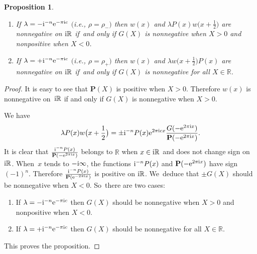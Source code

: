 \documentclass[pdftex]{sigma}
\newcommand{\RN}{\mathbb{R}} %
\newcommand{\bP}{\mathbf{P}}
\newtheorem{Proposition}[Theorem]{Proposition}
\theoremstyle{definition}
\numberwithin{equation}{section}
\begin{document}
\begin{Proposition}
\label{PropFromFunctionsToPolynomials}\qquad
\begin{enumerate}\itemsep=0pt
\item[$1.$]
If $\lambda=-{\rm i}^{-n}{\rm e}^{-\pi {\rm i}c}$ $($i.e., $\rho=\rho_-)$ then $w(x)$ and $\lambda P(x)w\big(x+\frac{1}{2}\big)$ are nonnegative on ${\rm i}\RN$ if~and only if $G(X)$ is nonnegative when $X>0$ and nonpositive when $X<0$.
\item[$2.$]
If $\lambda=+{\rm i}^{-n}{\rm e}^{-\pi {\rm i}c}$ $($i.e., $\rho=\rho_+)$ then $w(x)$ and $\lambda w\big(x+\frac{1}{2}\big)P(x)$ are nonnegative on ${\rm i}\RN$ if~and only if $G(X)$ is nonnegative for all $X\in \RN$.
\end{enumerate}

\end{Proposition}
\begin{proof}
It is easy to see that $\bP(X)$ is positive when $X>0$. Therefore $w(x)$ is nonnegative on~${\rm i}\RN$ if and only if $G(X)$ is nonnegative when $X>0$.

We have
\[
\lambda P(x)w\big(x+\frac{1}{2}\big)=\pm {\rm i}^{-n}P(x) {\rm e}^{2\pi {\rm i} cx}\frac{G(-{\rm e}^{2\pi {\rm i} x})}{\bP(-{\rm e}^{2\pi {\rm i} x})}.
\]
It is clear that $\frac{{\rm i}^{-n}P(x)}{\bP(-{\rm e}^{2\pi {\rm i} x})}$ belongs to $\RN$ when $x\in {\rm i}\RN$ and does not change sign on ${\rm i}\RN$. When~$x$ tends to $-{\rm i}\infty$, the functions ${\rm i}^{-n}P(x)$ and $\bP(-{\rm e}^{2\pi {\rm i} x})$ have sign $(-1)^n$. Therefore $\frac{{\rm i}^{-n}P(x)}{\bP({\rm e}^{-2\pi {\rm i}x})}$ is positive on ${\rm i}\RN$. We~deduce that $\pm G(X)$ should be nonnegative when $X<0$. So~there are two cases:
\begin{enumerate}\itemsep=0pt
\item
If $\lambda=-{\rm i}^{-n}{\rm e}^{-\pi {\rm i}c}$ then $G(X)$ should be nonnegative when $X>0$ and nonpositive when $X<0$.
\item
If $\lambda=+{\rm i}^{-n}{\rm e}^{-\pi {\rm i}c}$ then $G(X)$ should be nonnegative for all $X\in \RN$.
\end{enumerate}
This proves the proposition.
\end{proof}
\end{document}
